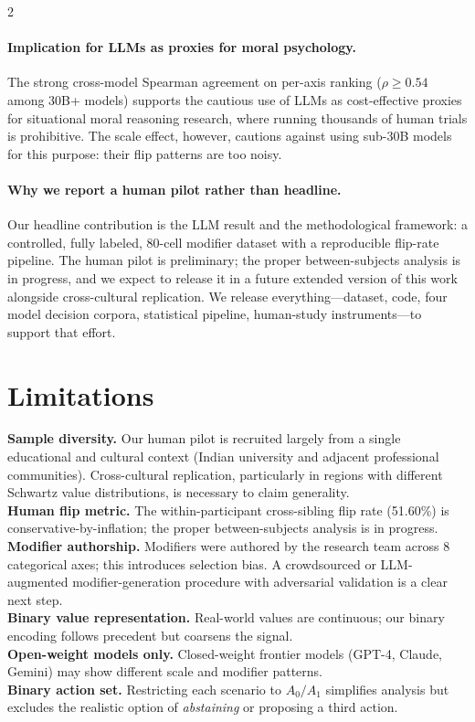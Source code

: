 \documentclass[11pt]{article}
\begin{document}
\begin{multicols}{2}
\paragraph{Implication for LLMs as proxies for moral psychology.} The strong cross-model Spearman agreement on per-axis ranking ($\rho\geq 0.54$ among 30B+ models) supports the cautious use of LLMs as cost-effective proxies for situational moral reasoning research, where running thousands of human trials is prohibitive. The scale effect, however, cautions against using sub-30B models for this purpose: their flip patterns are too noisy.

\paragraph{Why we report a human pilot rather than headline.} Our headline contribution is the LLM result and the methodological framework: a controlled, fully labeled, 80-cell modifier dataset with a reproducible flip-rate pipeline. The human pilot is preliminary; the proper between-subjects analysis is in progress, and we expect to release it in a future extended version of this work alongside cross-cultural replication. We release everything---dataset, code, four model decision corpora, statistical pipeline, human-study instruments---to support that effort.

\section{Limitations}
\label{sec:limitations}

\textbf{Sample diversity.} Our human pilot is recruited largely from a single educational and cultural context (Indian university and adjacent professional communities). Cross-cultural replication, particularly in regions with different Schwartz value distributions, is necessary to claim generality.\\[2pt]
\textbf{Human flip metric.} The within-participant cross-sibling flip rate (51.60\%) is conservative-by-inflation; the proper between-subjects analysis is in progress.\\[2pt]
\textbf{Modifier authorship.} Modifiers were authored by the research team across 8 categorical axes; this introduces selection bias. A crowdsourced or LLM-augmented modifier-generation procedure with adversarial validation is a clear next step.\\[2pt]
\textbf{Binary value representation.} Real-world values are continuous; our binary encoding follows precedent \citep{vista2025, sorensen2024value} but coarsens the signal.\\[2pt]
\textbf{Open-weight models only.} Closed-weight frontier models (GPT-4, Claude, Gemini) may show different scale and modifier patterns.\\[2pt]
\textbf{Binary action set.} Restricting each scenario to $A_0/A_1$ simplifies analysis but excludes the realistic option of \emph{abstaining} or proposing a third action.


\end{multicols}
\end{document}
